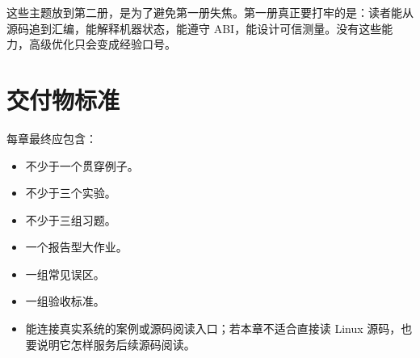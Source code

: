 这些主题放到第二册，是为了避免第一册失焦。第一册真正要打牢的是：读者能从源码追到汇编，能解释机器状态，能遵守 ABI，能设计可信测量。没有这些能力，高级优化只会变成经验口号。

\section*{交付物标准}

每章最终应包含：

\begin{itemize}
  \item 不少于一个贯穿例子。
  \item 不少于三个实验。
  \item 不少于三组习题。
  \item 一个报告型大作业。
  \item 一组常见误区。
  \item 一组验收标准。
  \item 能连接真实系统的案例或源码阅读入口；若本章不适合直接读 Linux 源码，也要说明它怎样服务后续源码阅读。
\end{itemize}
